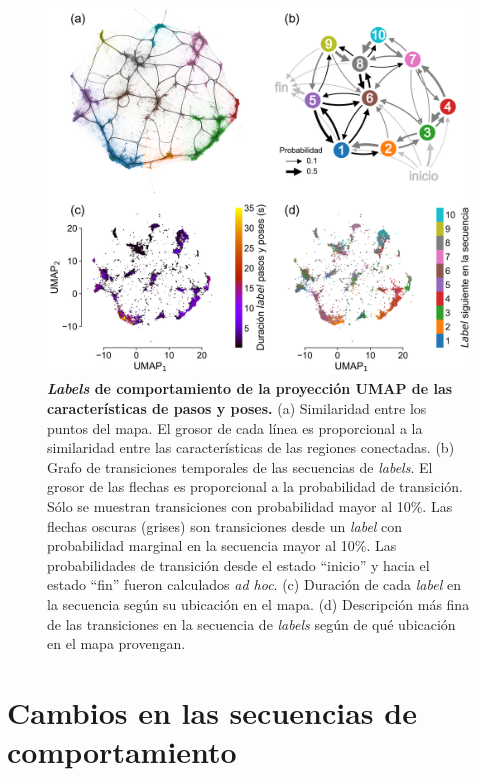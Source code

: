\begin{figure}[htbp]
    \centering
    \includegraphics[width=0.99\linewidth]{figuras/capitulo4/labels_umap_stp.png}
    \caption{\textbf{\textit{Labels} de comportamiento de la proyección UMAP de las características de pasos y poses.}
        (a) Similaridad entre los puntos del mapa. El grosor de cada línea es proporcional a la similaridad entre las características de las regiones conectadas. (b) Grafo de transiciones temporales de las secuencias de \textit{labels}. El grosor de las flechas es proporcional a la probabilidad de transición. Sólo se muestran transiciones con probabilidad mayor al 10\%. Las flechas oscuras (grises) son transiciones desde un \textit{label} con probabilidad marginal en la secuencia mayor al 10\%. Las probabilidades de transición desde el estado ``inicio'' y hacia el estado ``fin'' fueron calculados \textit{ad hoc}. (c) Duración de cada \textit{label} en la secuencia según su ubicación en el mapa. (d) Descripción más fina de las transiciones en la secuencia de \textit{labels} según de qué ubicación en el mapa provengan.}
    \label{fig:capitulo4_labels_umap_stp}
\end{figure}

\clearpage

\section{Cambios en las secuencias de comportamiento}\label{sec:probabilidad_labels}

